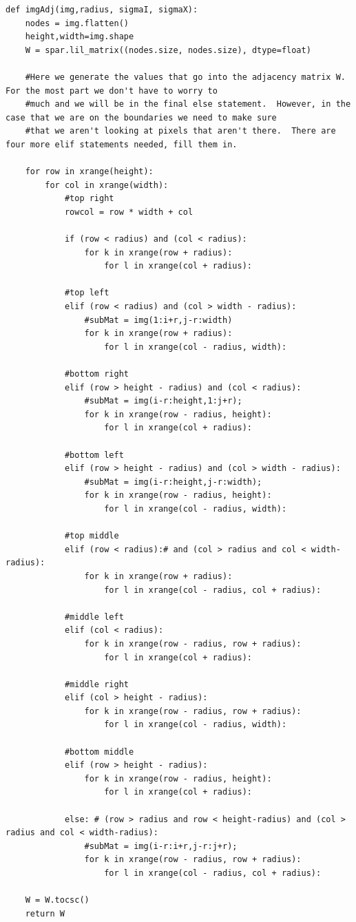 \begin{lstlisting}[style=python]
def imgAdj(img,radius, sigmaI, sigmaX):
    nodes = img.flatten()
    height,width=img.shape
    W = spar.lil_matrix((nodes.size, nodes.size), dtype=float)
    
    #Here we generate the values that go into the adjacency matrix W.  For the most part we don't have to worry to 
    #much and we will be in the final else statement.  However, in the case that we are on the boundaries we need to make sure
    #that we aren't looking at pixels that aren't there.  There are four more elif statements needed, fill them in.
            
    for row in xrange(height):
        for col in xrange(width):
            #top right
            rowcol = row * width + col
            
            if (row < radius) and (col < radius):
                for k in xrange(row + radius):
                    for l in xrange(col + radius):
            
            #top left
            elif (row < radius) and (col > width - radius):
                #subMat = img(1:i+r,j-r:width)
                for k in xrange(row + radius):
                    for l in xrange(col - radius, width):
                                    
            #bottom right	
            elif (row > height - radius) and (col < radius):
                #subMat = img(i-r:height,1:j+r);
                for k in xrange(row - radius, height):
                    for l in xrange(col + radius):

            #bottom left
            elif (row > height - radius) and (col > width - radius):
                #subMat = img(i-r:height,j-r:width);
                for k in xrange(row - radius, height):
                    for l in xrange(col - radius, width):

            #top middle
            elif (row < radius):# and (col > radius and col < width-radius):
                for k in xrange(row + radius):
                    for l in xrange(col - radius, col + radius):
  
            #middle left
            elif (col < radius):
                for k in xrange(row - radius, row + radius):
                    for l in xrange(col + radius):

            #middle right
            elif (col > height - radius):
                for k in xrange(row - radius, row + radius):
                    for l in xrange(col - radius, width):
                    
            #bottom middle
            elif (row > height - radius):
                for k in xrange(row - radius, height):
                    for l in xrange(col + radius):
            
            else: # (row > radius and row < height-radius) and (col > radius and col < width-radius):
                #subMat = img(i-r:i+r,j-r:j+r);
                for k in xrange(row - radius, row + radius):
                    for l in xrange(col - radius, col + radius):

    W = W.tocsc()    
    return W
    
\end{lstlisting}
